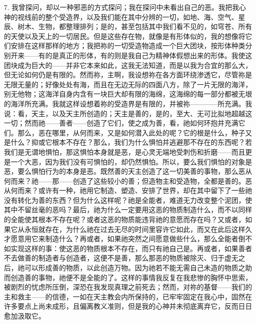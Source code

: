 7. 我曾探问，却以一种邪恶的方式探问；我在探问中未看出自己的恶。我把我心神的视线前的整个受造界，以及我们能在其中分辨的一切，如地、海、空气、星辰、树木、生物，都整理排列；是的，甚至包括其中我们看不见的，如穹苍、所有的天使以及天上的一切居民。但是这些存在物，就像是有形体似的，我的想像将它们安排在这样那样的地方；我把祢的一切受造物造成一个巨大团块，按形体种类分别开来——有的是真正的形体，有的则是我自己为精神体假想出来的形体。我使这团块成为巨大的——并非它本来如此，这我无法知道，而是以我为合宜的那么大，但无论如何仍是有限的。然而祢，主啊，我设想祢在各方面环绕渗透它，尽管祢是无限无量的；好像处处有海，而且在无边无际的四面八方，除了一片无限的海洋，别无他物；这海洋自身内含有一块巨大却有限的海绵，这海绵的每一部分都被无垠的海洋所充满。我就这样设想着祢的受造界是有限的，并被祢————所充满。我说：看，天主，以及天主所创造的；天主是善的，是的，至大、无可比拟地超越这一切；然而祂——善者——创造了它们，使之成为善，看，祂如何环抱并充满它们。那么，恶在哪里，从何而来，又是如何潜入此处的呢？它的根是什么，种子又是什么？抑或它根本不存在？那么，我们为什么惧怕并逃避那不存在的东西呢？若我们是无谓地惧怕，那这惧怕本身就是恶，是心灵无端地受刺伤和折磨——而且更是一个大恶，因为我们没有可惧怕的，却仍然惧怕。所以，要么我们惧怕的对象是恶，要么惧怕行为的本身是恶。既然善的天主创造了这一切美善的事物，那么恶从何而来？祂——那——创造了这些较小的善；但造物主和受造物，全都是善的。恶从何而来？或许有一种，祂用它制造、塑造、安排了世界，却在其中留下了一些祂没有转化为善的东西？但为什么这样呢？祂是全能者，难道无力改变整个泥团，使其中不留丝毫的恶吗？最后，祂为什么一定要用这恶的物质制造什么，而不以同样的全能使其根本不存在呢？或者这恶的物质能违背祂的意愿而存在吗？又或者，如果它从永恒就存在，为什么祂在过去无尽的时间里容许它如此，而又在此后这样久才愿意用它来制造什么？再或者，如果祂突然之间愿意做些什么，那么全能者倒不如实现这样的事：使这恶的物质根本不存在，而只有祂自己是。再或者，如果善者不去做善的制造者与创造者，这便不是善，那么那恶的物质被除灭、归于虚无之后，祂可以形成善的物质，以此创造万物。因为祂若不能无需自己未造的物质之助而创造善的事物，祂便不是全能的了。这样的事情我反复在我悲惨的胸怀中思索，被剧烈的忧虑所压倒，深恐在我发现真理之前死去；然而，对祢的基督——我们的主和救主——的信德，一如在天主教会内所保持的，已牢牢固定在我心中，固然在许多要点上尚未成形，且偏离教义准则，但是我的心神并未彻底离弃它，反而日日愈加汲取它。\par

